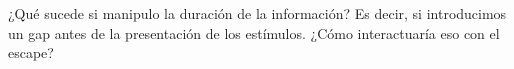 ¿Qué sucede si manipulo la duración de la información? Es decir, si introducimos un gap antes de la presentación de los estímulos. ¿Cómo interactuaría eso con el escape?
